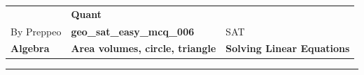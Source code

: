 \documentclass[11pt,paper=a4,answers]{exam}
\begin{document}
\begin{center}
    \centering
    \renewcommand{\arraystretch}{1.5}
    \begin{tabularx}{\textwidth}{YYY}
    & \normalsize\bf{{\Large{{Quant}}}} & \\
    By Preppeo & \normalsize\bf{{geo\_sat\_easy\_mcq\_006}} & SAT\\
    \normalsize{{\textbf{{Algebra}} }} & \normalsize{{\textbf{{Area volumes, circle, triangle }} }} & \normalsize{{\textbf{{Solving Linear Equations}} }} \\
    \end{tabularx}
\end{center}
\par\noindent\rule{\textwidth}{1pt}
\end{document}
